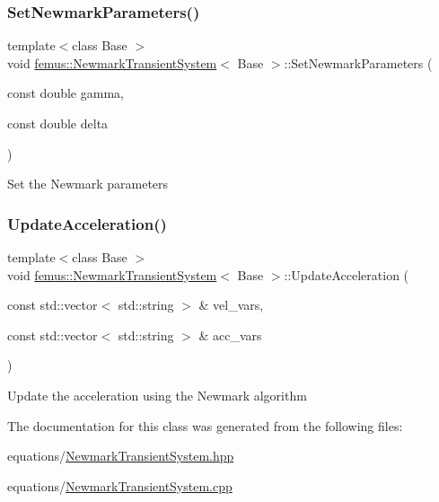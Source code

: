 \subsubsection{\texorpdfstring{Set\+Newmark\+Parameters()}{SetNewmarkParameters()}}
{\footnotesize\ttfamily template$<$class Base $>$ \\
void \mbox{\hyperlink{classfemus_1_1_newmark_transient_system}{femus\+::\+Newmark\+Transient\+System}}$<$ Base $>$\+::Set\+Newmark\+Parameters (\begin{DoxyParamCaption}\item[{const double}]{gamma,  }\item[{const double}]{delta }\end{DoxyParamCaption})}

Set the Newmark parameters \mbox{\label{classfemus_1_1_newmark_transient_system_a48a662cb269c1d3cedfe1840b467eee6}} 
\subsubsection{\texorpdfstring{Update\+Acceleration()}{UpdateAcceleration()}}
{\footnotesize\ttfamily template$<$class Base $>$ \\
void \mbox{\hyperlink{classfemus_1_1_newmark_transient_system}{femus\+::\+Newmark\+Transient\+System}}$<$ Base $>$\+::Update\+Acceleration (\begin{DoxyParamCaption}\item[{const std\+::vector$<$ std\+::string $>$ \&}]{vel\+\_\+vars,  }\item[{const std\+::vector$<$ std\+::string $>$ \&}]{acc\+\_\+vars }\end{DoxyParamCaption})}

Update the acceleration using the Newmark algorithm 

The documentation for this class was generated from the following files\+:\begin{DoxyCompactItemize}
\item 
equations/\mbox{\hyperlink{_newmark_transient_system_8hpp}{Newmark\+Transient\+System.\+hpp}}\item 
equations/\mbox{\hyperlink{_newmark_transient_system_8cpp}{Newmark\+Transient\+System.\+cpp}}\end{DoxyCompactItemize}
